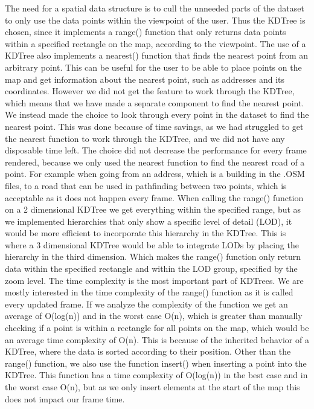 The need for a spatial data structure is to cull the unneeded parts of the dataset to only use the data points within the viewpoint of the user. Thus the KDTree is chosen, since it implements a range() function that only returns data points within a specified rectangle on the map, according to the viewpoint. The use of a KDTree also implements a nearest() function that finds the nearest point from an arbitrary point. This can be useful for the user to be able to place points on the map and get information about the nearest point, such as addresses and its coordinates. However we did not get the feature to work through the KDTree, which means that we have made a separate component to find the nearest point.
\newline
We instead made the choice to look through every point in the dataset to find the nearest point. This was done because of time savings, as we had struggled to get the nearest function to work through the KDTree, and we did not have any disposable time left. The choice did not decrease the performance for every frame rendered, because we only used the nearest function to find the nearest road of a point. For example when going from an address, which is a building in the .OSM files, to a road that can be used in pathfinding between two points, which is acceptable as it does not happen every frame.
\newline
When calling the range() function on a 2 dimensional KDTree we get everything within the specified range, but as we implemented hierarchies that only show a specific level of detail (LOD), it would be more efficient to incorporate this hierarchy in the KDTree. This is where a 3 dimensional KDTree would be able to integrate LODs by placing the hierarchy in the third dimension. Which makes the range() function only return data within the specified rectangle and within the LOD group, specified by the zoom level.
\newline
The time complexity is the most important part of KDTrees. We are mostly interested in the time complexity of the range() function as it is called every updated frame. If we analyze the complexity of the function we get an average of O(log(n)) and in the worst case O(n), which is greater than manually checking if a point is within a rectangle for all points on the map, which would be an average time complexity of O(n). This is because of the inherited behavior of a KDTree, where the data is  sorted according to their position. Other than the range() function, we also use the function insert() when inserting a point into the KDTree. This function has a time complexity of O(log(n)) in the best case and in the worst case O(n), but as we only insert elements at the start of the map this does not impact our frame time.
